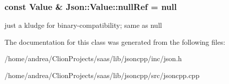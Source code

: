 \subsubsection[{\texorpdfstring{null\+Ref}{nullRef}}]{\setlength{\rightskip}{0pt plus 5cm}const {\bf Value} \& Json\+::\+Value\+::null\+Ref = {\bf null}\hspace{0.3cm}{\ttfamily [static]}}\hypertarget{class_json_1_1_value_aaa4ffd4e53967170c3e8c9abf682b5cd}{}\label{class_json_1_1_value_aaa4ffd4e53967170c3e8c9abf682b5cd}
just a kludge for binary-\/compatibility; same as null 

The documentation for this class was generated from the following files\+:\begin{DoxyCompactItemize}
\item 
/home/andrea/\+Clion\+Projects/saas/lib/jsoncpp/inc/json.\+h\item 
/home/andrea/\+Clion\+Projects/saas/lib/jsoncpp/src/jsoncpp.\+cpp\end{DoxyCompactItemize}
